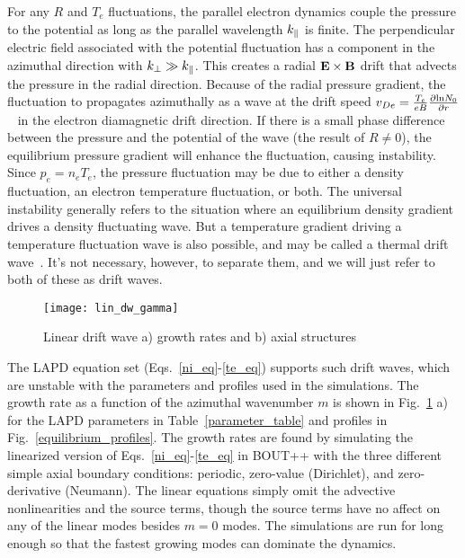For any $R$ and $T_e$ fluctuations, the parallel electron dynamics couple the pressure to the potential as long as the parallel wavelength $k_\parallel$ is finite. 
The perpendicular electric field associated with the potential fluctuation has a component in the azimuthal direction with $k_\perp \gg k_\parallel$. 
This creates a radial ${\bf E \times B}$ drift that advects the pressure in the radial direction. Because of the radial pressure gradient,
the fluctuation to propagates azimuthally as a wave at the drift speed $v_{De} = \frac{T_e}{e B} \frac{\partial{\rm ln} N_0}{\partial r}$~\cite{chen2006} in the electron diamagnetic drift direction. 
If there is a small phase difference between the pressure and the potential of the wave (the result of $R \ne 0$), the equilibrium pressure gradient will enhance the fluctuation, causing
instability. Since $p_e = n_e T_e$, the pressure fluctuation may be due to either a density fluctuation, an electron temperature fluctuation, or both. The universal instability generally
refers to the situation where an equilibrium density gradient drives a density fluctuating wave. But a temperature gradient driving a temperature fluctuation wave is also possible, and
may be called a thermal drift wave~\cite{makwana2011}. It's not necessary, however, to separate them, and we will just refer to both of these as drift waves.

\begin{figure}[!htbp]
\texttt{[image: lin\_dw\_gamma]}
\hfil
\caption{Linear drift wave a) growth rates and b) axial structures}
\label{lin_dw_gamma}
\end{figure}

The LAPD equation set (Eqs.~\ref{ni_eq}-\ref{te_eq}) supports such drift waves, which are unstable with the parameters and profiles used in the simulations. 
The growth rate as a function of the azimuthal
wavenumber $m$ is shown in Fig.~\ref{lin_dw_gamma} a) for the LAPD parameters in Table~\ref{parameter_table} and profiles in Fig.~\ref{equilibrium_profiles}. The growth rates are found by simulating
the linearized version of Eqs.~\ref{ni_eq}-\ref{te_eq} in BOUT++ with the three different simple axial boundary conditions: periodic, zero-value (Dirichlet), and zero-derivative (Neumann). 
The linear equations simply omit the advective nonlinearities and the source terms, though the source terms have no affect on any of the linear modes besides $m=0$ modes. The simulations are run
for long enough so that the fastest growing modes can dominate the dynamics.

